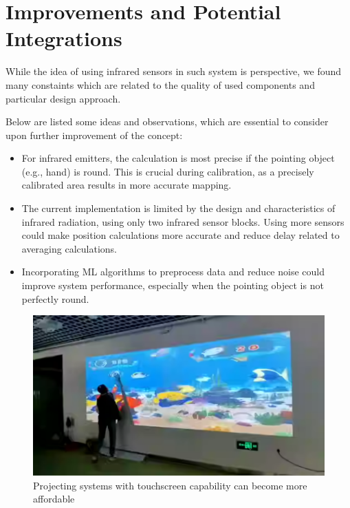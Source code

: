 \documentclass[12pt,a4paper]{article}
\begin{document}
\section{Improvements and Potential Integrations}

While the idea of using infrared sensors in such system is perspective, we found many constaints which are related to the quality of used components and particular design approach.

Below are listed some ideas and observations, which are essential to consider upon further improvement of the concept:

\begin{itemize}
    \item For infrared emitters, the calculation is most precise if the pointing object (e.g., hand) is round. This is crucial during calibration, as a precisely calibrated area results in more accurate mapping.
    \item The current implementation is limited by the design and characteristics of infrared radiation, using only two infrared sensor blocks. Using more sensors could make position calculations more accurate and reduce delay related to averaging calculations.
    \item Incorporating ML algorithms to preprocess data and reduce noise could improve system performance, especially when the pointing object is not perfectly round.
\end{itemize}

\begin{figure}[htbp]
    \centering
    \includegraphics[scale=0.6]{../IoT Materials/article images/14-Additional-distracting-3.png}
    \caption{Projecting systems with touchscreen capability can become more affordable}
\end{figure}
\end{document}
